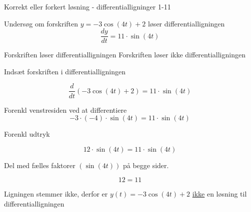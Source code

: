 \documentclass{article}
\begin{document}
\begin{exercise}{Korrekt eller forkert løsning - differentialligninger 1-11}


Undersøg om forskriften $y = -3 \cos(4t) + 2$ løser differentialligningen
\[
\frac{dy}{dt} = 11 \cdot \sin(4t)
\]

\begin{multichoice}
\itemfalse Forskriften løser differentialligningen
\itemtrue Forskriften løser ikke differentialligningen
\end{multichoice}

\hint

Indsæt forskriften i differentialligningen

\hint
\[
\frac{d}{dt} \left(-3 \cos(4t) + 2\right) = 11 \cdot \sin(4t)
\]


\hint

Forenkl venstresiden ved at differentiere
\[
-3 \cdot (-4) \cdot \sin(4t) = 11 \cdot \sin(4t)
\]

\hint

Forenkl udtryk

\hint
\[
12 \cdot \sin(4t) = 11 \cdot \sin(4t)
\]

\hint
Del med fælles faktorer $\left(\sin(4t) \right)$ på begge sider.

\hint

\[
12 = 11
\]


\hint

Ligningen stemmer ikke, derfor er $y(t) = -3 \cos(4t) + 2$ \underline{ikke} en løsning til differentialligningen

\end{exercise}

\newpage
\end{document}
